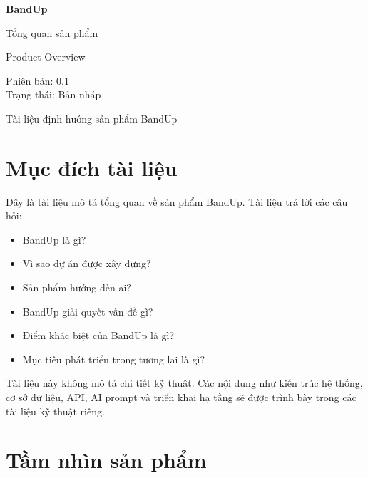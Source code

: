 \documentclass[12pt,a4paper]{article}
\begin{document}
\begin{titlepage}
\centering
\vspace*{3.2cm}
{\sffamily\fontsize{34}{40}\selectfont\bfseries\color{BandBlue} BandUp\par}
\vspace{0.6cm}
{\sffamily\fontsize{21}{26}\selectfont Tổng quan sản phẩm\par}
\vspace{0.35cm}
{\sffamily\large Product Overview\par}
\vfill
\begin{tcolorbox}[colback=BandLight,colframe=BandBlue,width=0.72\textwidth,boxrule=0.6pt,arc=2mm]
\centering\sffamily
Phiên bản: 0.1\\
Trạng thái: Bản nháp
\end{tcolorbox}
\vspace{1.4cm}
{\sffamily\small Tài liệu định hướng sản phẩm BandUp\par}
\vspace*{1.2cm}
\end{titlepage}

\tableofcontents
\newpage

\section*{Mục đích tài liệu}

Đây là tài liệu mô tả tổng quan về sản phẩm BandUp. Tài liệu trả lời các câu hỏi:

\begin{itemize}
  \item BandUp là gì?
  \item Vì sao dự án được xây dựng?
  \item Sản phẩm hướng đến ai?
  \item BandUp giải quyết vấn đề gì?
  \item Điểm khác biệt của BandUp là gì?
  \item Mục tiêu phát triển trong tương lai là gì?
\end{itemize}

Tài liệu này không mô tả chi tiết kỹ thuật. Các nội dung như kiến trúc hệ thống, cơ sở dữ liệu, API, AI prompt và triển khai hạ tầng sẽ được trình bày trong các tài liệu kỹ thuật riêng.

\section{Tầm nhìn sản phẩm}
\end{document}
